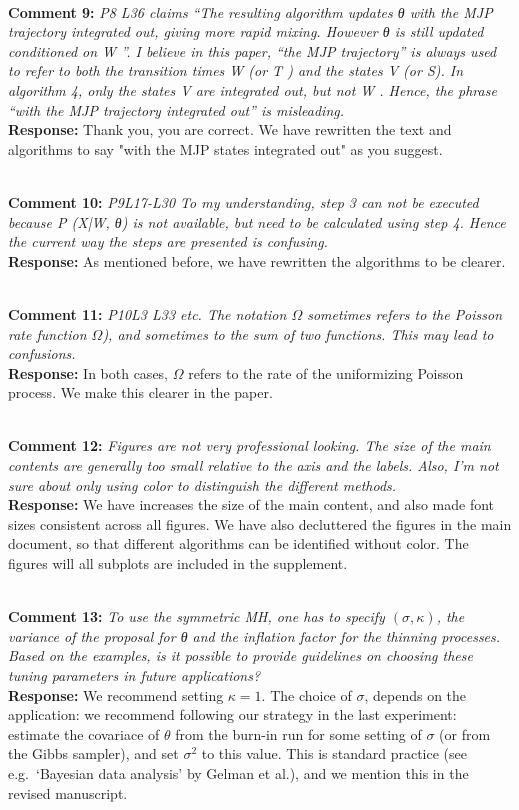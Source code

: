 \documentclass[11pt]{article}
\newcommand{\rev}[2]{\textbf{Comment #1: }\emph{#2}}
\newcommand{\resp}{\textbf{Response: }}
\begin{document}
~\\
\rev{9}{P8 L36 claims “The resulting algorithm updates θ with the MJP trajectory integrated out, giving more rapid mixing. However θ is still updated conditioned on W ”. I believe in this paper, “the MJP trajectory” is always used to refer to both the transition times W (or T ) and the states V (or S). In algorithm 4, only the states V are integrated out, but not W . Hence, the phrase “with the MJP trajectory integrated out” is misleading.}\\
\resp{Thank you, you are correct. We have rewritten the text and algorithms to say "with the MJP states integrated out" as you suggest.}

~\\
\rev{10}{P9L17-L30 To my understanding, step 3 can not be executed because P (X|W, θ) is not available, but need to be calculated using step 4. Hence the current way the steps are presented is confusing.} \\
\resp{As mentioned before, we have rewritten the algorithms to be clearer.}

~\\
\rev{11}{P10L3 L33 etc. The notation $\Omega$ sometimes refers to the Poisson rate function $\Omega$), and sometimes to the sum of two functions. This may lead to confusions.}
~\\ 
\resp{In both cases, $\Omega$ refers to the rate of the uniformizing Poisson process. We make this clearer in the paper}. 

~\\ 
\rev{12}{Figures are not very professional looking. The size of the main contents are generally too small relative to the axis and the labels. Also, I’m not sure about only using color to distinguish the different methods.}\\
\resp{We have increases the size of the main content, and also made font sizes consistent across all figures. We have also decluttered the figures in the main document, so that different algorithms can be identified without color. The figures will all subplots are included in the supplement.} 

~\\ 
\rev{13}{To use the symmetric MH, one has to specify $(\sigma, \kappa)$, the variance of the proposal for θ and the inflation factor for the thinning processes. Based on the examples, is it possible to provide guidelines on choosing these tuning parameters in future applications?} 
\\ 
\resp{We recommend setting $\kappa = 1$. The choice of $\sigma$, depends on the application: we recommend following our strategy in the last experiment: estimate the covariace of $\theta$ from the burn-in run for some setting of $\sigma$ (or from the Gibbs sampler), and set $\sigma^2$ to this  value. This is standard practice (see e.g.\ `Bayesian data analysis' by Gelman et al.), and we mention this in the revised manuscript.}
~\\
\end{document}
